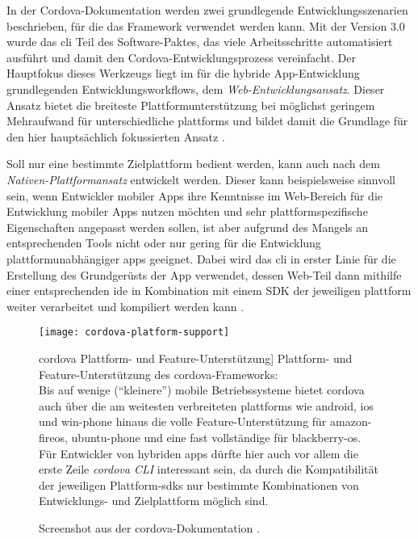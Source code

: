 In der Cordova-Dokumentation werden zwei grundlegende Entwicklungsszenarien beschrieben, für die das Framework verwendet werden kann. 
Mit der Version 3.0 wurde das \gls{cli} Teil des Software-Paktes, das viele Arbeitsschritte automatisiert ausführt und damit den Cordova-Entwicklungsprozess vereinfacht. 
Der Hauptfokus dieses Werkzeugs liegt im für die hybride App-Entwicklung grundlegenden Entwicklungsworkflows, dem \emph{Web-Ent\-wick\-lungs\-an\-satz}. %
Dieser Ansatz bietet die breiteste Plattformunterstützung bei möglichst geringem Mehraufwand für unterschiedliche \glspl{plattform} und bildet damit die Grundlage für den hier hauptsächlich fokussierten Ansatz \cite{Cordova-Docs_CLI}.

Soll nur eine bestimmte Zielplattform bedient werden, kann auch nach dem \emph{Nativen-Plattformansatz} entwickelt werden.
Dieser kann beispielsweise sinnvoll sein, wenn Entwickler mobiler Apps ihre Kenntnisse im Web-Bereich für die Entwicklung mobiler Apps nutzen möchten und sehr plattformspezifische Eigenschaften angepasst werden sollen, ist aber aufgrund des Mangels an entsprechenden Tools nicht oder nur gering für die Entwicklung plattformunabhängiger \glspl{app} geeignet. 
Dabei wird das \gls{cli} in erster Linie für die Erstellung des Grundgerüsts der App verwendet, dessen Web-Teil dann mithilfe einer entsprechenden \gls{ide} in Kombination mit einem SDK der jeweiligen \gls{plattform} weiter verarbeitet und kompiliert werden kann \cite{Cordova-Docs_CLI}. 


\begin{figure}[h!]
\centering
\texttt{[image: cordova-platform-support]}
	\caption
	[\gls{cordova} Plattform- und Feature-Unterstützung]
	{Plattform- und Feature-Unterstützung des \gls{cordova}-Frameworks: \\ 
	Bis auf wenige (\enquote{kleinere}) mobile Betriebssysteme bietet \gls{cordova} auch über die am weitesten verbreiteten \glspl{plattform} wie \gls{android}, \gls{ios} und \gls{win-phone} hinaus die volle Feature-Unterstützung für \gls{amazon-fireos}, \gls{ubuntu-phone} und eine fast vollständige für \gls{blackberry-os}.\\
	Für Entwickler von hybriden \glspl{app} dürfte hier auch vor allem die erste Zeile \emph{cordova CLI} interessant sein, da durch die Kompatibilität der jeweiligen Plattform-\glspl{sdk} nur bestimmte Kombinationen von Entwicklungs- und Zielplattform möglich sind.
	}
	\label{fig:cordova-platform-support}
		\imagesourcefont
		\vspace{\imagesourcespace}
		\imagesourcefont{}
		\caption*{\imagesourcelabel Screenshot aus der \gls{cordova}-Dokumentation \cite{Cordova-Docs_Platform-Support}.}
\end{figure}


